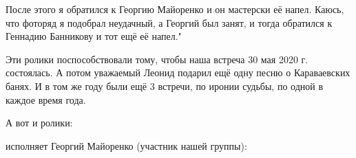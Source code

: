 После этого я обратился к Георгию Майоренко и он мастерски её напел. Каюсь, что
фоторяд я подобрал неудачный, а Георгий был занят, и тогда обратился к Геннадию
Банникову и тот ещё её напел."

Эти ролики поспособствовали тому, чтобы наша встреча 30 мая 2020 г. состоялась.
А потом уважаемый Леонид подарил ещё одну песню о Караваевских банях. И в том
же году были ещё 3 встречи, по иронии судьбы, по одной в каждое время года.

А вот и ролики:

исполняет Георгий Майоренко (участник нашей группы):

